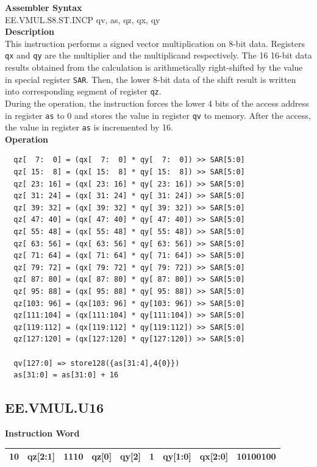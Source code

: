 \textbf{Assembler Syntax} \\
EE.VMUL.S8.ST.INCP qv, as, qz, qx, qy \\
\textbf{Description} \\
This instruction performs a signed vector multiplication on 8-bit data. Registers \lstinline{qx} and \lstinline{qy} are the multiplier and the multiplicand respectively. The 16 16-bit data results obtained from the calculation is arithmetically right-shifted by the value in special register \lstinline{SAR}. Then, the lower 8-bit data of the shift result is written into corresponding segment of register \lstinline{qz}. \\ During the operation, the instruction forces the lower 4 bits of the access address in register \lstinline{as} to 0 and stores the value in register \lstinline{qv} to memory. After the access, the value in register \lstinline{as} is incremented by 16.\\
\textbf{Operation}
\begin{lstlisting}
  qz[  7:  0] = (qx[  7:  0] * qy[  7:  0]) >> SAR[5:0]
  qz[ 15:  8] = (qx[ 15:  8] * qy[ 15:  8]) >> SAR[5:0]
  qz[ 23: 16] = (qx[ 23: 16] * qy[ 23: 16]) >> SAR[5:0]
  qz[ 31: 24] = (qx[ 31: 24] * qy[ 31: 24]) >> SAR[5:0]
  qz[ 39: 32] = (qx[ 39: 32] * qy[ 39: 32]) >> SAR[5:0]
  qz[ 47: 40] = (qx[ 47: 40] * qy[ 47: 40]) >> SAR[5:0]
  qz[ 55: 48] = (qx[ 55: 48] * qy[ 55: 48]) >> SAR[5:0]
  qz[ 63: 56] = (qx[ 63: 56] * qy[ 63: 56]) >> SAR[5:0]
  qz[ 71: 64] = (qx[ 71: 64] * qy[ 71: 64]) >> SAR[5:0]
  qz[ 79: 72] = (qx[ 79: 72] * qy[ 79: 72]) >> SAR[5:0]
  qz[ 87: 80] = (qx[ 87: 80] * qy[ 87: 80]) >> SAR[5:0]
  qz[ 95: 88] = (qx[ 95: 88] * qy[ 95: 88]) >> SAR[5:0]
  qz[103: 96] = (qx[103: 96] * qy[103: 96]) >> SAR[5:0]
  qz[111:104] = (qx[111:104] * qy[111:104]) >> SAR[5:0]
  qz[119:112] = (qx[119:112] * qy[119:112]) >> SAR[5:0]
  qz[127:120] = (qx[127:120] * qy[127:120]) >> SAR[5:0]

  qv[127:0] => store128({as[31:4],4{0}})
  as[31:0] = as[31:0] + 16
\end{lstlisting}

\clearpage
\subsection{EE.VMUL.U16}\label{instruction:EEVMULU16}
\setlength\tabcolsep{6pt}
\textbf{Instruction Word} \\
\begin{tabular}{|c|c|c|c|c|c|c|c|c|}
	\hline
	10 & qz[2:1] & 1110 & qz[0] & qy[2] & 1 & qy[1:0] & qx[2:0] & 10100100 \\
	\hline
\end{tabular}

